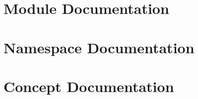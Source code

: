 \documentclass[twoside]{book}
\newcommand{\+}{\discretionary{\mbox{\scriptsize$\hookleftarrow$}}{}{}}
\begin{document}
\chapter{Module Documentation}


















\chapter{Namespace Documentation}































\chapter{Concept Documentation}

























































\end{document}

